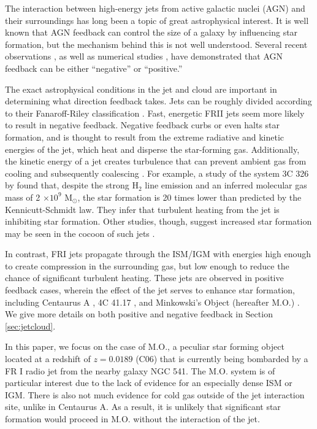 \documentclass{aastex6}
\begin{document}
The interaction between high-energy jets from active galactic nuclei (AGN) and their surroundings has long been a topic of great astrophysical interest. It is well known that AGN feedback can control the size of a galaxy by influencing star formation, but the mechanism behind this is not well understood.  Several recent observations \citep{Nesvadba10,Guillard15}, as well as numerical studies \citep[e.g.][]{Sutherland07,Antonuccio08,Gaibler12}, have demonstrated that AGN feedback can be either ``negative'' or ``positive.''

The exact astrophysical conditions in the jet and cloud are important in determining what direction feedback takes. Jets can be roughly divided according to their Fanaroff-Riley classification \citep{FR74}. Fast, energetic FRII jets seem more likely to result in negative feedback. Negative feedback curbs or even halts star formation, and is thought to result from the extreme radiative and kinetic energies of the jet, which heat and disperse the star-forming gas. Additionally, the kinetic energy of a jet creates turbulence that can prevent ambient gas from cooling and subsequently coalescing \citep[e.g.][]{Nesvadba10}. For example, a study of the system 3C 326 by \citet{Ogle07} found that, despite the strong H$_{2}$ line emission and an inferred molecular gas mass of 2 $\times 10^{9}$ M$_{\odot}$, the star formation is 20 times lower than predicted by the Kennicutt-Schmidt law.  They infer that turbulent heating from the jet is inhibiting star formation. Other studies, though, suggest increased star formation may be seen in the cocoon of such jets \citep[e.g.][]{Gaibler12}. 

In contrast, FRI jets propagate through the ISM/IGM with energies high enough to create compression in the surrounding gas, but low enough to reduce  the chance of significant turbulent heating. These jets are observed in positive feedback cases,  wherein the effect of the jet serves to enhance star formation, including Centaurus A \citep[][and references therein]{Salome16}, 4C 41.17 \citep{Bicknell00}, and Minkowski's Object (hereafter M.O.) \citep[][hereafter C06]{Croft06}. We give more details on both positive and negative feedback in Section \ref{sec:jetcloud}.  

In this paper, we focus on the case of M.O., a peculiar star forming object located at a redshift of $z = 0.0189$ (C06) that is currently being bombarded by a FR I radio jet from the nearby galaxy NGC 541. The M.O. system is of particular interest due to the lack of evidence for an especially dense ISM or IGM. There is also not much evidence for cold gas outside of the jet interaction site, unlike in Centaurus A. As a result, it is unlikely that significant star formation would proceed in M.O. without the interaction of the jet. 
\end{document}
